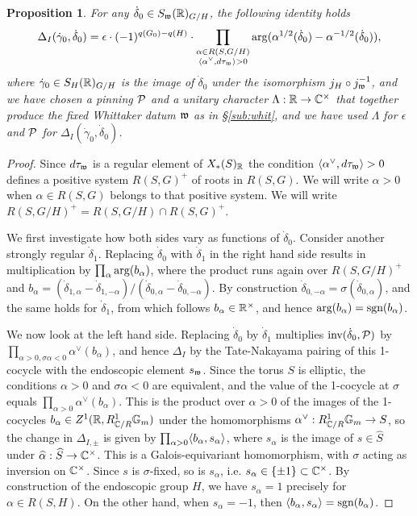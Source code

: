 \documentclass{article}
\newtheorem{pro}[thm]{Proposition}
\theoremstyle{definition}
\numberwithin{equation}{section}
\renewcommand{\-}{\hyp{}}
\begin{document}
\begin{pro} \label{pro:magic}
For any $\dot\delta_0 \in S_{\mathfrak{w}}(\mathbb{R})_{G/H}$, the following identity holds
\[  \Delta_{I}(\dot\gamma_0,\dot\delta_0) = \epsilon\cdot(-1)^{q(G_0)-q(H)}\cdot\prod_{\substack{\alpha \in R(S,G/H)\\ \langle\alpha^\vee,d\tau_{\mathfrak{w}}\rangle>0}}\arg(\alpha^{1/2}(\dot\delta_0) - \alpha^{-1/2}(\dot\delta_0)), \]
where $\dot\gamma_0 \in S_H(\mathbb{R})_{G/H}$ is the image of $\dot\delta_0$ under the isomorphism $j_H \circ j_{\mathfrak{w}}^{-1}$, and we have chosen a pinning $\mathcal{P}$ and a unitary character $\Lambda : \mathbb{R} \to \mathbb{C}^\times$ that together produce the fixed Whittaker datum $\mathfrak{w}$ as in \S\ref{sub:whit}, and we have used $\Lambda$ for $\epsilon$ and $\mathcal{P}$ for $\Delta_{I}(\dot\gamma_0,\dot\delta_0)$.
\end{pro}
\begin{proof}
Since $d\tau_{\mathfrak{w}}$ is a regular element of $X_*(S)_{\mathbb{R}}$ the condition $\langle\alpha^\vee,d\tau_{\mathfrak{w}}\rangle>0$ defines a positive system $R(S,G)^+$ of roots in $R(S,G)$. We will write $\alpha>0$ when $\alpha \in R(S,G)$ belongs to that positive system. We will write $R(S,G/H)^+ = R(S,G/H) \cap R(S,G)^+$.

	We first investigate how both sides vary as functions of $\dot\delta_0$. Consider another strongly regular $\dot\delta_1$. Replacing $\dot\delta_0$ with $\dot\delta_1$ in the right hand side results in multiplication by $\prod_\alpha \textrm{arg}(b_\alpha)$, where the product runs again over $R(S,G/H)^+$ and $b_\alpha=(\dot\delta_{1,\alpha}-\dot\delta_{1,-\alpha})/(\dot\delta_{0,\alpha}-\dot\delta_{0,-\alpha})$. By construction $\dot\delta_{0,-\alpha}=\sigma(\dot\delta_{0,\alpha})$, and the same holds for $\dot\delta_1$, from which follows $b_\alpha \in \mathbb{R}^\times$, and hence $\textrm{arg}(b_\alpha)=\textrm{sgn}(b_\alpha)$.

We now look at the left hand side. Replacing $\dot\delta_0$ by $\dot\delta_1$ multiplies $\textrm{inv}(\dot\delta_0,\mathcal{P})$ by $\prod_{\alpha>0,\sigma\alpha<0}\alpha^\vee(b_\alpha)$, and hence $\Delta_{I}$ by the Tate-Nakayama pairing of this 1-cocycle with the endoscopic element $s_{\mathfrak{w}}$. Since the torus $S$ is elliptic, the conditions $\alpha>0$ and $\sigma\alpha<0$ are equivalent, and the value of the 1-cocycle at $\sigma$ equals $\prod_{\alpha>0}\alpha^\vee(b_\alpha)$. This is the product over $\alpha>0$ of the images of the 1-cocycles $b_\alpha \in Z^1(\mathbb{R},R_{\mathbb{C}/R}^1\mathbb{G}_m)$ under the homomorphisms $\alpha^\vee : R_{\mathbb{C}/R}^1\mathbb{G}_m \to S$, so the change in $\Delta_{I,\pm}$ is given by $\prod_{\alpha>0}\langle b_\alpha,s_\alpha\rangle$, where $s_\alpha$ is the image of $s \in \hat S$ under $\widehat\alpha : \widehat S \to \mathbb{C}^\times$. This is a Galois-equivariant homomorphism, with $\sigma$ acting as inversion on $\mathbb{C}^\times$. Since $s$ is $\sigma$-fixed, so is $s_\alpha$, i.e. $s_\alpha \in \{\pm1\} \subset \mathbb{C}^\times$. By construction of the endoscopic group $H$, we have $s_\alpha=1$ precisely for $\alpha \in R(S,H)$. On the other hand, when $s_\alpha=-1$, then $\langle b_\alpha,s_\alpha\rangle=\textrm{sgn}(b_\alpha)$.


\end{proof}
\end{document}
